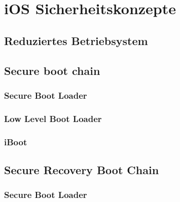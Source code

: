 %
%
% 
% 
% 
\chapter{iOS Sicherheitskonzepte}
\label{ch:iOSSicherheitsKonzepte}
\section{Reduziertes Betriebsystem}
\label{sec:reduziertesOS}

\section{Secure boot chain}
\label{sec:SecBootChain}

\subsection{Secure Boot Loader}
\label{sec:SecBootLoader}

\subsection{Low Level Boot Loader}
\label{sec:LowLevelBootLoader}

\subsection{iBoot}
\label{sec:iBoot}

\section{Secure Recovery Boot Chain}
\label{sec:SecureRecoveryBootChain}

    \subsection{Secure Boot Loader}
    \label{sec:SecureBootLoader1}
